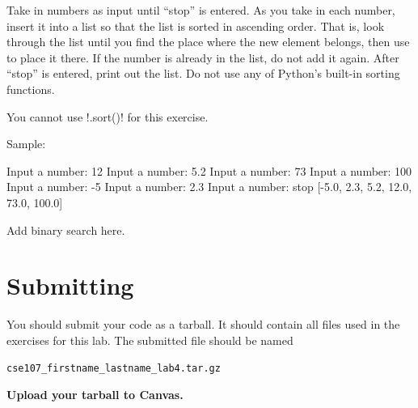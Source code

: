 \documentclass[11pt]{cselabheader}
\begin{document}
\begin{ex}[sorted.py] Take in numbers as input until ``stop'' is entered. As you
  take in each number, insert it into a list so that the list is sorted in
  ascending order. That is, look through the list until you find the place where
  the new element belongs, then use  to place it there.
  If the number is already in the list, do not add it again. After ``stop'' is
  entered, print out the list. Do not use any of Python's built-in sorting
  functions.

  You cannot use \pythoninline!.sort()! for this exercise.

  Sample:

  \begin{verbatimcode}
Input a number: 12
Input a number: 5.2
Input a number: 73
Input a number: 100
Input a number: -5
Input a number: 2.3
Input a number: stop
[-5.0, 2.3, 5.2, 12.0, 73.0, 100.0]
  \end{verbatimcode}

\end{ex}

\begin{ex}[binary.py]
  Add binary search here.
\end{ex}

\pagebreak
\section{Submitting}

You should submit your code as a tarball. It should contain all files
used in the exercises for this lab. The submitted file should be named
\begin{center}
  \texttt{cse107\_firstname\_lastname\_lab4.tar.gz}
\end{center}

\begin{center}
  \textbf{Upload your tarball to Canvas.}
\end{center}

\listoftheorems
\end{document}
